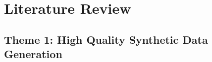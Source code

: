 \documentclass[12pt,a4paper]{article}
\begin{document}













\section{Literature Review}






\subsection{Theme 1: High Quality Synthetic Data Generation}



\end{document}
